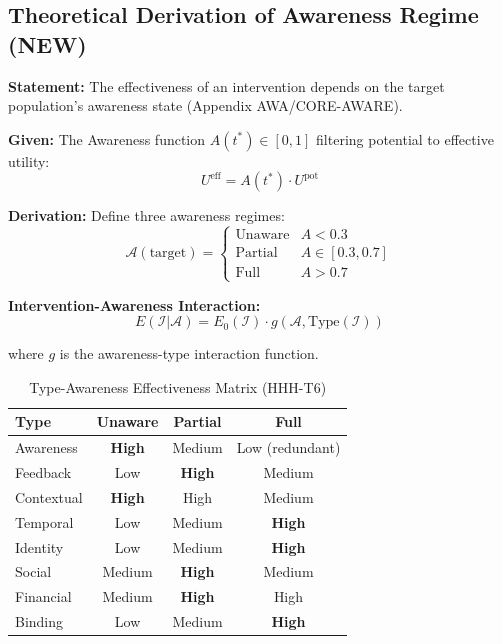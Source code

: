 \subsection{Theoretical Derivation of Awareness Regime (NEW)}
\label{sec:hhh-awareness}

\begin{tcolorbox}[colback=blue!5!white, colframe=blue!75!black,
    title=\textbf{Theorem HHH-T6: Awareness Regime Emergence from AWARE}]

\textbf{Statement:} The effectiveness of an intervention depends on the target population's awareness state (Appendix AWA/CORE-AWARE).

\textbf{Given:} The Awareness function $A(t^*) \in [0, 1]$ filtering potential to effective utility:
\begin{equation}
U^{\text{eff}} = A(t^*) \cdot U^{\text{pot}}
\end{equation}

\textbf{Derivation:} Define three awareness regimes:
\begin{equation}
\mathcal{A}(\text{target}) = \begin{cases}
\text{Unaware} & A < 0.3 \\
\text{Partial} & A \in [0.3, 0.7] \\
\text{Full} & A > 0.7
\end{cases}
\label{eq:hhh-awareness-regime}
\end{equation}

\textbf{Intervention-Awareness Interaction:}
\begin{equation}
E(\mathcal{I} | \mathcal{A}) = E_0(\mathcal{I}) \cdot g(\mathcal{A}, \text{Type}(\mathcal{I}))
\end{equation}

where $g$ is the awareness-type interaction function.

\end{tcolorbox}

\begin{table}[htbp]
\centering
\caption{Type-Awareness Effectiveness Matrix (HHH-T6)}
\label{tab:hhh-awareness-matrix}
\renewcommand{\arraystretch}{1.2}
\begin{tabular}{@{}l|ccc@{}}
\toprule
\textbf{Type} & \textbf{Unaware} & \textbf{Partial} & \textbf{Full} \\
\midrule
Awareness & \textbf{High} & Medium & Low (redundant) \\
Feedback & Low & \textbf{High} & Medium \\
Contextual & \textbf{High} & High & Medium \\
Temporal & Low & Medium & \textbf{High} \\
Identity & Low & Medium & \textbf{High} \\
Social & Medium & \textbf{High} & Medium \\
Financial & Medium & \textbf{High} & High \\
Binding & Low & Medium & \textbf{High} \\
\bottomrule
\end{tabular}
\end{table}


